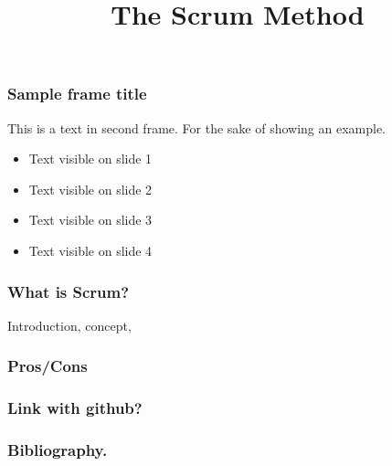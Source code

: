 \documentclass{beamer}
\title{The Scrum Method}
\begin{document}
\begin{frame}
    \frametitle{Sample frame title}
    
    This is a text in second frame. 
    For the sake of showing an example.
    
    \begin{itemize}
     \item<1-> Text visible on slide 1
     \item<2-> Text visible on slide 2
     \item<3> Text visible on slide 3
     \item<4> Text visible on slide 4
    \end{itemize}
    
\end{frame}

\begin{frame}
    \frametitle{What is Scrum?}
    Introduction, concept, 

\end{frame}

\begin{frame}
    \frametitle{Pros/Cons}

\end{frame}

\begin{frame}
    \frametitle{Link with github?}

\end{frame}

\begin{frame}
    \frametitle{Bibliography.}

\end{frame}
\end{document}
